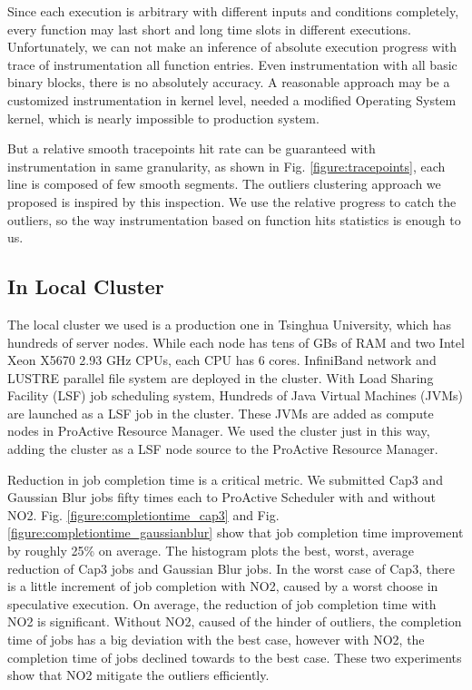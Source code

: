 Since each execution is arbitrary with different inputs and conditions completely, every function may last short and long time slots in different executions. Unfortunately, we can not make an inference of absolute execution progress with  trace of instrumentation all function entries. Even instrumentation with all basic binary blocks, there is no absolutely accuracy. A reasonable approach may be a customized instrumentation in kernel level, needed a modified Operating System kernel, which is nearly impossible to production system.

But a relative smooth tracepoints hit rate can be guaranteed with instrumentation in same granularity, as shown in Fig.  \ref{figure:tracepoints}, each line is composed of few smooth segments. The outliers clustering approach we proposed is inspired by this inspection. We use the relative progress to catch the outliers, so the way instrumentation based on function hits statistics is enough to us.

\subsection{In Local Cluster}

The local cluster we used is a production one in Tsinghua University, which has hundreds of  server nodes. While each node has tens of GBs of RAM and two Intel Xeon X5670 2.93 GHz CPUs, each CPU has 6 cores. InfiniBand network and LUSTRE parallel file system are deployed in the cluster. With Load Sharing Facility (LSF) job scheduling system, Hundreds of Java Virtual Machines (JVMs) are launched as a LSF job in the cluster. These JVMs are added as compute nodes in ProActive Resource Manager. We used the cluster just in this way, adding the cluster as a LSF node source to the ProActive Resource Manager.

Reduction in job completion time is a critical metric. We submitted Cap3 and Gaussian Blur jobs fifty times each to ProActive Scheduler with and without NO2. Fig. \ref{figure:completiontime_cap3} and Fig. \ref{figure:completiontime_gaussianblur} show that job completion time improvement by roughly 25\% on average. The histogram plots the best, worst, average reduction of Cap3 jobs and Gaussian Blur jobs. In the worst case of Cap3, there is a little increment of job completion with NO2, caused by a worst choose in speculative execution. On average, the reduction of job completion time with NO2 is significant. Without NO2, caused of the hinder of outliers, the completion time of jobs has a big deviation with the best case, however with NO2, the completion time of jobs declined towards to the best case. These two experiments show that NO2 mitigate the outliers efficiently.

